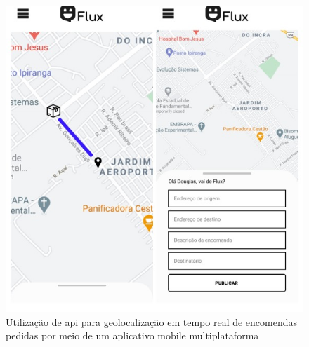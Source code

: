 \begin{figure}
\centering
\caption{Utilização de api para geolocalização em tempo real de encomendas pedidas por meio de um aplicativo mobile multiplataforma}
\label{fig:Oliveira12022}
\includegraphics[scale=0.8]{Illustrations/Oliveira12002.jpg}
\end{figure}